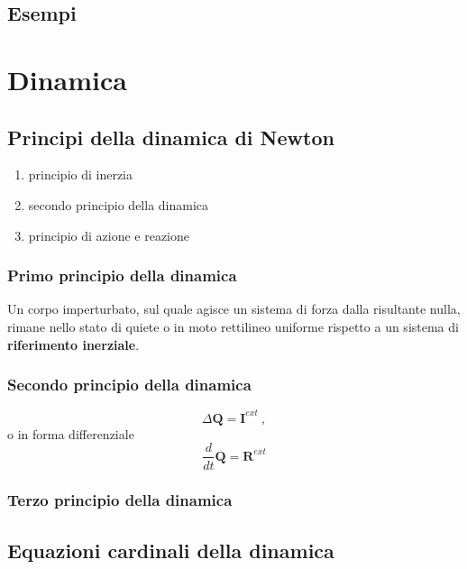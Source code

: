 \section{Esempi}



\chapter{Dinamica}\label{mechanics:dynamics}
\section{Principi della dinamica di Newton}
\begin{enumerate}
  \item principio di inerzia
  \item secondo principio della dinamica
  \item principio di azione e reazione
\end{enumerate}
\subsection{Primo principio della dinamica}
Un corpo imperturbato, sul quale agisce un sistema di forza dalla risultante nulla, rimane nello stato di quiete o in moto rettilineo uniforme rispetto a un sistema di \textbf{riferimento inerziale}.

\noindent
{\color{red}{Cosa intendiamo per sistema di riferimento inerziale?}}

\subsection{Secondo principio della dinamica}
\begin{equation}
    \Delta \mathbf{Q} = \mathbf{I}^{ext} \ ,
\end{equation}
o in forma differenziale
\begin{equation}
    \dfrac{d}{dt}\mathbf{Q} = \mathbf{R}^{ext}
\end{equation}

\subsection{Terzo principio della dinamica}

\section{Equazioni cardinali della dinamica}
